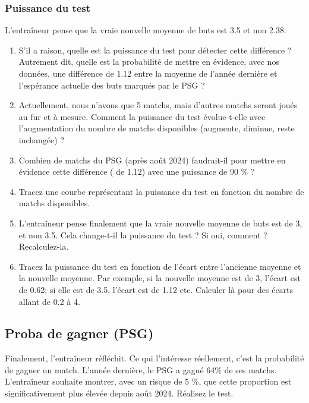 \documentclass[
]{article}
\begin{document}
\hypertarget{puissance-du-test}{%
\subsubsection{Puissance du test}\label{puissance-du-test}}

L'entraîneur pense que la vraie nouvelle moyenne de buts est 3.5 et non
2.38.

\begin{enumerate}
\def\labelenumi{\arabic{enumi}.}
\setcounter{enumi}{4}
\item
  S'il a raison, quelle est la puissance du test pour détecter cette
  différence ? Autrement dit, quelle est la probabilité de mettre en
  évidence, avec nos données, une différence de 1.12 entre la moyenne de
  l'année dernière et l'espérance actuelle des buts marqués par le PSG ?
\item
  Actuellement, nous n'avons que 5 matchs, mais d'autres matchs seront
  joués au fur et à mesure. Comment la puissance du test évolue-t-elle
  avec l'augmentation du nombre de matchs disponibles (augmente,
  diminue, reste inchangée) ?
\item
  Combien de matchs du PSG (après août 2024) faudrait-il pour mettre en
  évidence cette différence ( de 1.12) avec une puissance de 90 \% ?
\item
  Tracez une courbe représentant la puissance du test en fonction du
  nombre de matchs disponibles.
\item
  L'entraîneur pense finalement que la vraie nouvelle moyenne de buts
  est de 3, et non 3.5. Cela change-t-il la puissance du test ? Si oui,
  comment ? Recalculez-la.
\item
  Tracez la puissance du test en fonction de l'écart entre l'ancienne
  moyenne et la nouvelle moyenne. Par exemple, si la nouvelle moyenne
  est de 3, l'écart est de 0.62; si elle est de 3.5, l'écart est de 1.12
  etc. Calculer là pour des écarts allant de 0.2 à 4.
\end{enumerate}

\hypertarget{proba-de-gagner-psg}{%
\subsection{Proba de gagner (PSG)}\label{proba-de-gagner-psg}}

Finalement, l'entraîneur réfléchit. Ce qui l'intéresse réellement, c'est
la probabilité de gagner un match. L'année dernière, le PSG a gagné 64\%
de ses matchs. L'entraîneur souhaite montrer, avec un risque de 5 \%,
que cette proportion est significativement plus élevée depuis août 2024.
Réalisez le test.
\end{document}

